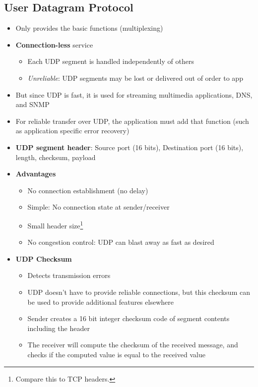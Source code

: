 \subsection{User Datagram Protocol}
\begin{itemize}
	\item Only provides the basic functions (multiplexing)
	\item \textbf{Connection-less} service
	\begin{itemize}
		\item Each UDP segment is handled independently of others
		\item \textit{Unreliable}: UDP segments may be lost or delivered out of order to app
	\end{itemize}
	\item But since UDP is fast, it is used for streaming multimedia applications, DNS, and SNMP
	\item For reliable transfer over UDP, the application must add that function (such as application specific error recovery)
	\item \textbf{UDP segment header}: Source port (16 bits), Destination port (16 bits), length, checksum, payload
	\item \textbf{Advantages}
	\begin{itemize}
		\item No connection establishment (no delay)
		\item Simple: No connection state at sender/receiver
		\item Small header size\footnote{Compare this to TCP headers.}
		\item No congestion control: UDP can blast away as fast as desired
	\end{itemize}
	\item \textbf{UDP Checksum}
	\begin{itemize}
		\item Detects transmission errors
		\item UDP doesn't have to provide reliable connections, but this checksum can be used to provide additional features elsewhere
		\item Sender creates a 16 bit integer checksum code of segment contents including the header
		\item The receiver will compute the checksum of the received message, and checks if the computed value is equal to the received value
	\end{itemize}
\end{itemize}

